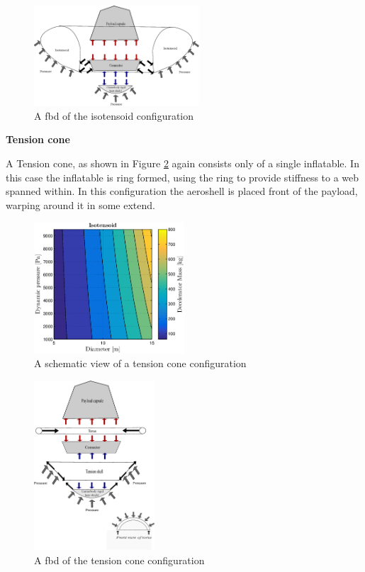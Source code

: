 \begin{figure}[H]
\centering
\includegraphics[width = 0.55\textwidth]{Figure/FBD_isotensoid.eps}
\caption{A \gls{fbd} of the isotensoid configuration}
\label{fig:fbd_iso}
\end{figure}

\textbf{Tension cone}

A Tension cone, as shown in Figure \ref{fig:conc_tension} again consists only of a single inflatable. In this case the inflatable is ring formed, using the ring to provide stiffness to a web spanned within. In this configuration the aeroshell is placed front of the payload, warping around it in some extend.

\begin{figure}[H]
\centering
\includegraphics[width = 0.5\textwidth]{Figure/ISO_comp.eps}
\caption{A schematic view of a tension cone configuration}
\label{fig:conc_tension}
\end{figure}

\begin{figure}[H]
\centering
\includegraphics[width = 0.4\textwidth]{Figure/FBD_tensioncone.eps}
\caption{A \gls{fbd} of the tension cone configuration}
\label{fig:fbd_tension}
\end{figure}

